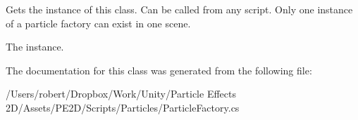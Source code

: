 Gets the instance of this class. Can be called from any script. Only one instance of a particle factory can exist in one scene. 

The instance.

The documentation for this class was generated from the following file\+:\begin{DoxyCompactItemize}
\item 
/\+Users/robert/\+Dropbox/\+Work/\+Unity/\+Particle Effects 2\+D/\+Assets/\+P\+E2\+D/\+Scripts/\+Particles/Particle\+Factory.\+cs\end{DoxyCompactItemize}
